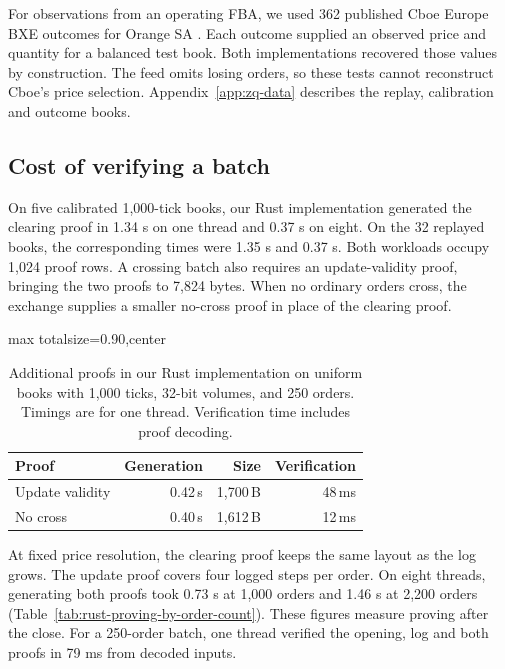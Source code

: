 For observations from an operating FBA, we used 362 published Cboe Europe BXE outcomes for Orange SA \cite{cboepitch,zhang2023}. Each outcome supplied an observed price and quantity for a balanced test book. Both implementations recovered those values by construction. The feed omits losing orders, so these tests cannot reconstruct Cboe's price selection. Appendix~\ref{app:zq-data} describes the replay, calibration and outcome books.

\subsection{Cost of verifying a batch}
\label{sec:zq-cost}

On five calibrated 1,000-tick books, our Rust implementation generated the clearing proof in 1.34 s on one thread and 0.37 s on eight. On the 32 replayed books, the corresponding times were 1.35 s and 0.37 s. Both workloads occupy 1,024 proof rows. A crossing batch also requires an update-validity proof, bringing the two proofs to 7,824 bytes. When no ordinary orders cross, the exchange supplies a smaller no-cross proof in place of the clearing proof.

\begin{table}[!tp]
\centering
\caption{Additional proofs in our Rust implementation on uniform books with
1,000 ticks, 32-bit volumes, and 250 orders. Timings are for one thread.
Verification time includes proof decoding.}
\label{tab:rust-additional-proofs}
\setlength{\tabcolsep}{3pt}
\begin{adjustbox}{max totalsize={\linewidth}{0.90\textheight},center}
\begin{tabular}{@{}lrrr@{}}
\toprule
Proof & Generation & Size & Verification \\
\midrule
Update validity & 0.42\,s & 1,700\,B & 48\,ms \\
No cross        & 0.40\,s & 1,612\,B & 12\,ms \\
\bottomrule
\end{tabular}
\end{adjustbox}
\end{table}

At fixed price resolution, the clearing proof keeps the same layout as the log grows. The update proof covers four logged steps per order. On eight threads, generating both proofs took 0.73 s at 1,000 orders and 1.46 s at 2,200 orders (Table~\ref{tab:rust-proving-by-order-count}). These figures measure proving after the close. For a 250-order batch, one thread verified the opening, log and both proofs in 79 ms from decoded inputs.

